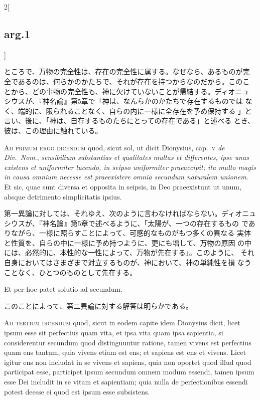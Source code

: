 \documentclass[paper=a4paper,fontsize=10pt,jafontsize=9pt,titlepage]{jlreq}
\begin{document}
\begin{paracol}{2}[\subsection{arg.1}]
\switchcolumn

ところで、万物の完全性は、存在の完全性に属する。なぜなら、あるものが完
全であるのは、何らかのかたちで、それが存在を持つからなのだから。このこ
とから、どの事物の完全性も、神に欠けていないことが帰結する。ディオニュ
シウスが、『神名論』第5章で「神は、なんらかのかたちで存在するものでは
なく、端的に、限られることなく、自らの内に一様に全存在を予め保持する
」と言い、後に、「神は、自存するものたちにとっての存在である」と述べる
とき、彼は、この理由に触れている。

\switchcolumn*[\subsection{ad.1}]

{\scshape Ad primum ergo dicendum} quod, sicut sol, ut dicit
Dionysius, cap.~{\scshape v} {\itshape de Div.~Nom}., {\itshape
sensibilium substantias et qualitates multas et differentes, ipse unus
existens et uniformiter lucendo, in seipso uniformiter praeaccipit;
ita multo magis in causa omnium necesse est praeexistere omnia
secundum naturalem unionem}. Et sic, quae sunt diversa et opposita in
seipsis, in Deo praeexistunt ut unum, absque detrimento simplicitatis
ipsius.

\switchcolumn

第一異論に対しては、それゆえ、次のように言わなければならない。ディオニュ
シウスが、『神名論』第5章で述べるように、「太陽が、一つの存在するもの
でありながら、一様に照らすことによって、可感的なものがもつ多くの異なる
実体と性質を、自らの中に一様に予め持つように、更にも増して、万物の原因
の中には、必然的に、本性的な一性によって、万物が先在する」。このように、
それ自身においてはさまざまで対立するものが、神において、神の単純性を損
なうことなく、ひとつのものとして先在する。

\switchcolumn*[\subsection{ad.2}]

Et per hoc patet solutio ad secundum.

\switchcolumn

このことによって、第二異論に対する解答は明らかである。

\switchcolumn*[\subsection{ad.3}]

{\scshape Ad tertium dicendum} quod, sicut in eodem capite idem
Dionysius dicit, licet ipsum esse sit perfectius quam vita, et ipsa
vita quam ipsa sapientia, si considerentur secundum quod distinguuntur
ratione, tamen vivens est perfectius quam ens tantum, quia vivens
etiam est ens; et sapiens est ens et vivens. Licet igitur ens non
includat in se vivens et sapiens, quia non oportet quod illud quod
participat esse, participet ipsum secundum omnem modum essendi, tamen
ipsum esse Dei includit in se vitam et sapientiam; quia nulla de
perfectionibus essendi potest deesse ei quod est ipsum esse
subsistens.


\end{paracol}
\end{document}
